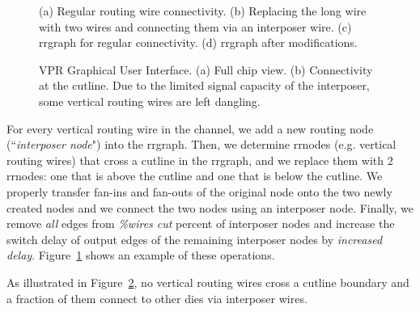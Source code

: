 \documentclass{sig-alternate-2013}
\begin{document}
\begin{figure}[!t]
\caption{(a) Regular routing wire connectivity. (b) Replacing the long wire with two wires and connecting them via an interposer wire. (c) rrgraph for regular connectivity. (d) rrgraph after modifications.}
\label{fig:rrgraph_ops}
\end{figure}

\begin{figure}[!thpb]
\caption{VPR Graphical User Interface. (a) Full chip view. (b) Connectivity at the cutline. Due to the limited signal capacity of the interposer, some vertical routing wires are left dangling.}
\label{fig:vpr_interposer_gui}
\end{figure}

For every vertical routing wire in the channel, we add a new routing node (``\textit{interposer node}") into the rrgraph. Then, we determine rrnodes (e.g. vertical routing wires) that cross a cutline in the rrgraph, and we replace them with 2 rrnodes: one that is above the cutline and one that is below the cutline. We properly transfer fan-ins and fan-outs of the original node onto the two newly created nodes and we connect the two nodes using an interposer node. Finally, we remove \textit{all} edges from \textit{\%wires cut} percent of interposer nodes and increase the switch delay of output edges of the remaining interposer nodes by \textit{increased delay}. Figure~\ref{fig:rrgraph_ops} shows an example of these operations.

As illustrated in Figure~\ref{fig:vpr_interposer_gui}, no vertical routing wires cross a cutline boundary and a fraction of them connect to other dies via interposer wires.
\end{document}
